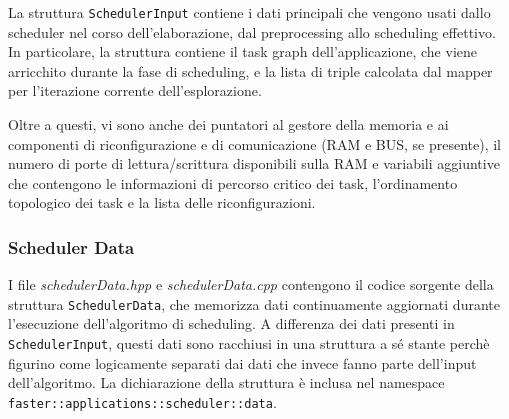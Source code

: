 La struttura \verb+SchedulerInput+ contiene i dati principali che vengono usati 
dallo scheduler nel corso dell'elaborazione, dal preprocessing allo scheduling 
effettivo. In particolare, la struttura contiene il task graph dell'applicazione,
che viene arricchito durante la fase di scheduling, e la lista di triple calcolata
dal mapper per l'iterazione corrente dell'esplorazione.

Oltre a questi, vi sono anche dei puntatori al gestore della memoria e ai 
componenti di riconfigurazione e di comunicazione (\acs{RAM} e BUS, se 
presente), il numero di porte di lettura/scrittura disponibili sulla \acs{RAM} 
e variabili aggiuntive che contengono le informazioni di percorso critico dei 
task, l'ordinamento topologico dei task e la lista delle riconfigurazioni.

\subsubsection{Scheduler Data}
I file \emph{schedulerData.hpp} e \emph{schedulerData.cpp} contengono il codice 
sorgente della struttura \verb+SchedulerData+, che memorizza dati continuamente 
aggiornati durante l'esecuzione dell'algoritmo di scheduling. A differenza dei 
dati presenti in \verb+SchedulerInput+, questi dati sono racchiusi in una 
struttura a sé stante perchè figurino come logicamente separati dai dati che 
invece fanno parte dell'input dell'algoritmo. La dichiarazione della struttura è
inclusa nel namespace \verb+faster::applications::scheduler::data+.

